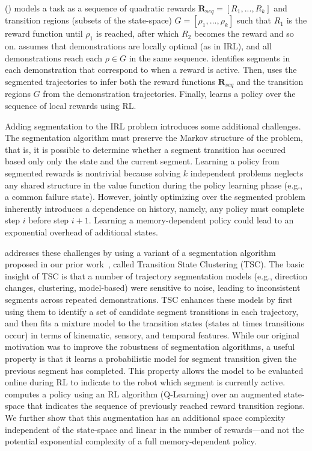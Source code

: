 \hirlfull (\hirl) models a task as a sequence of quadratic rewards $\mathbf{R}_{seq}=[R_1,...,R_k]$ and transition regions (subsets of the state-space) $G = [\rho_1, ...,\rho_k]$ such that $R_1$ is the reward function until $\rho_1$ is reached, after which $R_2$ becomes the reward and so on.
\hirl assumes that demonstrations are locally optimal (as in IRL), and all demonstrations reach each $\rho \in G$ in the same sequence.
\hirl identifies segments in each demonstration that correspond to when a reward is active.
Then, \hirl uses the segmented trajectories to infer both the reward functions $\mathbf{R}_{seq}$ and the transition regions $G$ from the demonstration trajectories.
Finally, \hirl learns a policy over the sequence of local rewards using RL.

Adding segmentation to the IRL problem introduces some additional challenges.
The segmentation algorithm must preserve the Markov structure of the problem, that is, it is possible to determine whether a segment transition has occured based only only the state and the current segment.
Learning a policy from segmented rewards is nontrivial because solving $k$ independent problems neglects any shared structure in the value function during the policy learning phase (e.g., a common failure state).
However, jointly optimizing over the segmented problem inherently introduces a dependence on history, namely, any policy must complete step $i$ before step $i+1$.
Learning a memory-dependent policy could lead to an exponential overhead of additional states. 

\hirl addresses these challenges by using a variant of a segmentation algorithm proposed in our prior work~\cite{krishnan2015tsc,murali2016}, called Transition State Clustering (TSC). The basic insight of TSC is that a number of trajectory segmentation models (e.g., direction changes, clustering, model-based) were sensitive to noise, leading to inconsistent segments across repeated demonstrations.
TSC enhances these models by first using them to identify a set of candidate segment transitions in each trajectory, and then fits a mixture model to the transition states (states at times transitions occur) in terms of kinematic, sensory, and temporal features. 
While our original motivation was to improve the robustness of segmentation algorithms, a useful property is that it learns a probabilistic model for segment transition given the previous segment has completed.
This property allows the model to be evaluated online during RL to indicate to the robot which segment is currently active.
\hirl computes a policy using an RL algorithm (Q-Learning) over an augmented state-space that indicates the sequence of previously reached reward transition regions. We further show that this augmentation has an additional space complexity independent of the state-space and linear in the number of rewards---and not the potential exponential complexity of a full memory-dependent policy.

